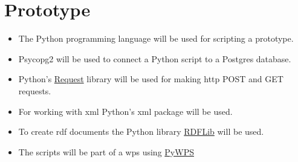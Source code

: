 \section{Prototype}
\begin{itemize}
	\item The Python programming language will be used for scripting a prototype. 
	\item Psycopg2 will be used to connect a Python script to a Postgres database.
	\item Python's \href{http://docs.python-requests.org/en/latest/user/quickstart/}{Request} library will be used for making \ac{http} POST and GET requests. 
	\item For working with \ac{xml} Python's xml package will be used.
	\item To create \ac{rdf} documents the Python library \href{https://rdflib.readthedocs.org/en/stable/}{RDFLib} will be used. 
	\item The scripts will be part of a \ac{wps} using \href{http://pywps.wald.intevation.org/}{PyWPS} 
\end{itemize}









  


